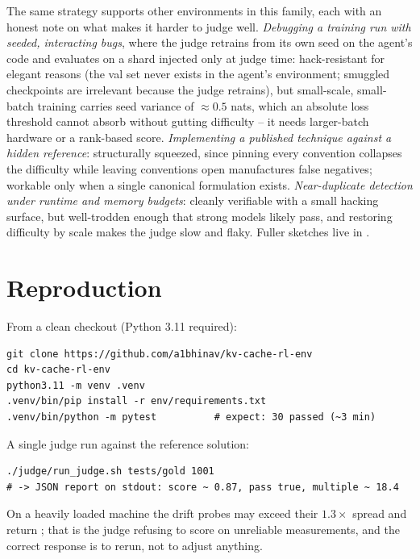 \documentclass[11pt]{article}
\newcommand{\pc}[1]{\texttt{\detokenize{#1}}}
\begin{document}
The same strategy supports other environments in this family, each with an honest note
on what makes it harder to judge well. \emph{Debugging a training run with seeded,
interacting bugs}, where the judge retrains from its own seed on the agent's code and
evaluates on a shard injected only at judge time: hack-resistant for elegant reasons
(the val set never exists in the agent's environment; smuggled checkpoints are
irrelevant because the judge retrains), but small-scale, small-batch training carries
seed variance of $\approx 0.5$ nats, which an absolute loss threshold cannot absorb
without gutting difficulty -- it needs larger-batch hardware or a rank-based score.
\emph{Implementing a published technique against a hidden reference}: structurally
squeezed, since pinning every convention collapses the difficulty while leaving
conventions open manufactures false negatives; workable only when a single canonical
formulation exists. \emph{Near-duplicate detection under runtime and memory budgets}:
cleanly verifiable with a small hacking surface, but well-trodden enough that strong
models likely pass, and restoring difficulty by scale makes the judge slow and flaky.
Fuller sketches live in \pc{docs/extending.md}.

\section{Reproduction}

From a clean checkout (Python 3.11 required):

\begin{lstlisting}[style=plain]
git clone https://github.com/a1bhinav/kv-cache-rl-env
cd kv-cache-rl-env
python3.11 -m venv .venv
.venv/bin/pip install -r env/requirements.txt
.venv/bin/python -m pytest          # expect: 30 passed (~3 min)
\end{lstlisting}

A single judge run against the reference solution:

\begin{lstlisting}[style=plain]
./judge/run_judge.sh tests/gold 1001
# -> JSON report on stdout: score ~ 0.87, pass true, multiple ~ 18.4
\end{lstlisting}

On a heavily loaded machine the drift probes may exceed their $1.3\times$ spread and
return \pc{INVALID_RUN}; that is the judge refusing to score on unreliable
measurements, and the correct response is to rerun, not to adjust anything.
\end{document}
